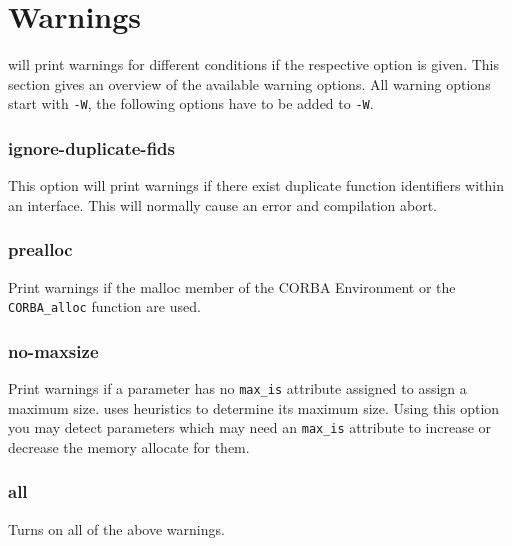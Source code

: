 \section{Warnings}
\dice{} will print warnings for different conditions if the respective
option is given. This section gives an overview of the available warning
options. All warning options start with \verb|-W|, the following options
have to be added to \verb|-W|.

\subsubsection{ignore-duplicate-fids}
This option will print warnings if there exist duplicate function identifiers
within an interface. This will normally cause an error and compilation 
abort.

\subsubsection{prealloc}
Print warnings if the malloc member of the CORBA Environment or the
\verb|CORBA_alloc| function are used.

\subsubsection{no-maxsize}
Print warnings if a parameter has no \verb|max_is| attribute assigned
to assign a maximum size. \dice{} uses heuristics to determine its
maximum size. Using this option you may detect parameters which may
need an \verb|max_is| attribute to increase or decrease the memory
allocate for them.

\subsubsection{all}
Turns on all of the above warnings.


